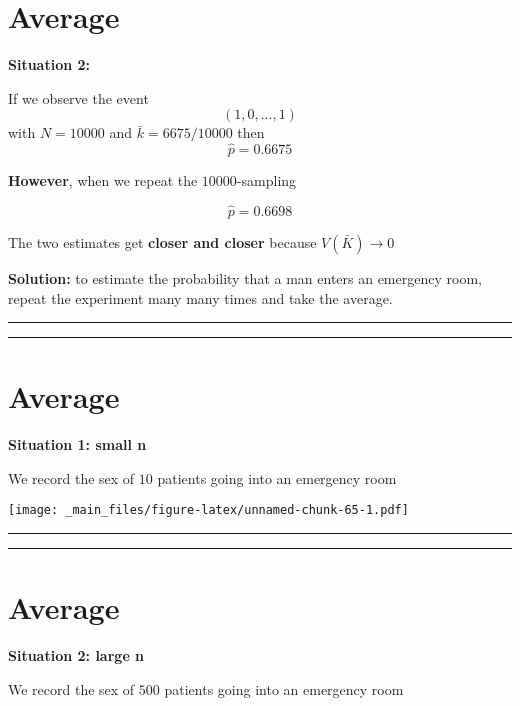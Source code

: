 \documentclass[
]{book}
\begin{document}
\hypertarget{average-6}{%
\section{Average}\label{average-6}}

\textbf{Situation 2:}

If we observe the event \[(1, 0, ..., 1)\]
with \(N=10000\) and \(\bar{k}= 6675/10000\) then \[\hat{p}= 0.6675\]

\textbf{However}, when we repeat the \(10000\)-sampling

\[\hat{p}=0.6698\]

The two estimates get \textbf{closer and closer} because \(V(\bar{K}) \rightarrow 0\)

\textbf{Solution:} to estimate the probability that a man enters an emergency room, repeat the experiment many many times and take the average.

\begin{center}\rule{0.5\linewidth}{0.5pt}\end{center}

\begin{center}\rule{0.5\linewidth}{0.5pt}\end{center}

\hypertarget{average-7}{%
\section{Average}\label{average-7}}

\textbf{Situation 1: small n}

We record the sex of \(10\) patients going into an emergency room

\texttt{[image: \_main\_files/figure-latex/unnamed-chunk-65-1.pdf]}

\begin{center}\rule{0.5\linewidth}{0.5pt}\end{center}

\begin{center}\rule{0.5\linewidth}{0.5pt}\end{center}

\hypertarget{average-8}{%
\section{Average}\label{average-8}}

\textbf{Situation 2: large n}

We record the sex of \(500\) patients going into an emergency room
\end{document}
